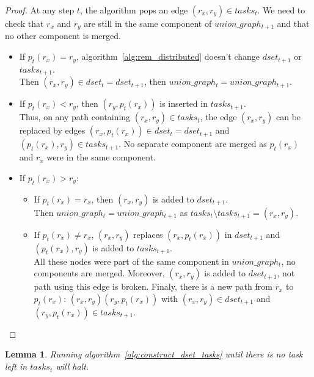 \documentclass[12px]{article}
\newtheorem{lemma}[theorem]{Lemma}
\begin{document}
        \begin{proof}
          At any step $t$, the algorithm pops an edge $(r_x, r_y) \in tasks_t$. We need to check that $r_x$ and $r_y$ are still in the same component of $union\_graph_{t+1}$ and that no other component is merged.
          \begin{itemize}
            \item If $p_t(r_x) = r_y$, algorithm~\ref{alg:rem_distributed} doesn't change $dset_{t+1}$ or $tasks_{t+1}$. \\
              Then $(r_x, r_y) \in dset_t = dset_{t+1}$, then $union\_graph_t = union\_graph_{t+1}$.

            \item If $p_t(r_x) < r_y$, then $(r_y, p_t(r_x))$ is inserted in $tasks_{t+1}$. \\
              Thus, on any path containing $(r_x, r_y) \in tasks_t$, the edge $(r_x, r_y)$ can be replaced by edges $(r_x, p_t(r_x)) \in dset_t = dset_{t+1}$ and $(p_t(r_x), r_y) \in tasks_{t+1}$. No separate component are merged as $p_t(r_x)$ and $r_x$ were in the same component.

            \item If $p_t(r_x) > r_y$:
            \begin{itemize}
              \item If $p_t(r_x) = r_x$, then $(r_x, r_y)$ is added to $dset_{t+1}$. \\
                Then $union\_graph_t = union\_graph_{t+1}$ as $tasks_t \setminus tasks_{t+1} = {(r_x, r_y)}$.
              \item If $p_t(r_x) \neq r_x$, $(r_x, r_y)$ replaces $(r_x, p_t(r_x))$ in $dset_{t+1}$ and $(p_t(r_x), r_y)$ is added to $tasks_{t+1}$. \\
                All these nodes were part of the same component in $union\_graph_t$, no components are merged. Moreover, $(r_x, r_y)$ is added to $dset_{t+1}$, not path using this edge is broken. Finaly, there is a new path from $r_x$ to $p_t(r_x)$: $(r_x, r_y)(r_y, p_t(r_x))$ with $(r_x, r_y) \in dset_{t+1}$ and $(r_y, p_t(r_x)) \in tasks_{t+1}$.
            \end{itemize}
          \end{itemize}
        \end{proof}

        \begin{lemma}%
          \label{lemma:halt}
          Running algorithm~\ref{alg:construct_dset_tasks} until there is no task left in $tasks_t$ will halt.
        \end{lemma}
\end{document}
